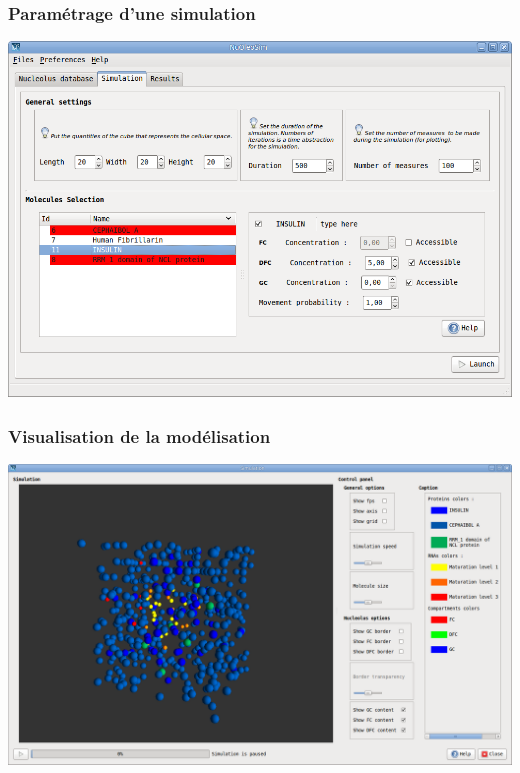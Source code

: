 \documentclass{beamer}
\begin{document}
\begin{frame}
  \frametitle{Paramétrage d'une simulation}

  \begin{center}
      \includegraphics[width=0.9\columnwidth]{img/inter2.png}
  \end{center}

\end{frame}

\begin{frame}
  \frametitle{Visualisation de la modélisation}

    \begin{center}
      \includegraphics[width=1\columnwidth]{img/inter3.png}
  \end{center}

\end{frame}
\end{document}
